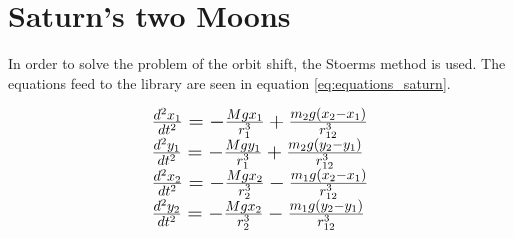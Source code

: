 \section{Saturn's two Moons}
In order to solve the problem of the orbit shift, the Stoerms method is used.
The equations feed to the library are seen in equation \ref{eq:equations_saturn}.

\begin{equation}
\Large{
\begin{array}{l}
\frac{d^2x_1}{dt^2} = - \frac{M g x_1}{r_1^3} + \frac{m_2 g (x_2 - x_1)}{r_{12}^3}\\
\frac{d^2y_1}{dt^2} = - \frac{M g y_1}{r_1^3} + \frac{m_2 g (y_2 - y_1)}{r_{12}^3}\\
\frac{d^2x_2}{dt^2} = - \frac{M g x_2}{r_2^3} - \frac{m_1 g (x_2 - x_1)}{r_{12}^3}\\
\frac{d^2y_2}{dt^2} = - \frac{M g x_2}{r_2^3} - \frac{m_1 g (y_2 - y_1)}{r_{12}^3}
\end{array}
}
\label{eq:equations_saturn}
\end{equation}




